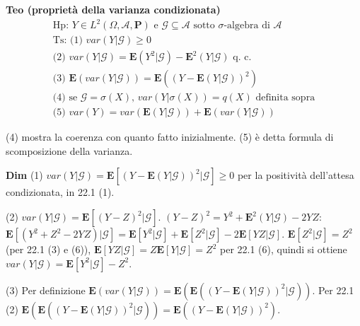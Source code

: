\documentclass{article}
\begin{document}
\textbf{Teo (propriet\`{a} della varianza condizionata)}%
\begin{gather*}
\text{Hp: }Y\in L^{2}\left( \Omega ,\mathcal{A},\mathbf{P}\right) \text{ e }%
\mathcal{G\subseteq A}\text{ sotto }\sigma \text{-algebra di }\mathcal{A} \\
\text{Ts: (1) }var\left( Y|\mathcal{G}\right) \geq 0 \\
\text{(2) }var\left( Y|\mathcal{G}\right) =\mathbf{E}\left( Y^{2}|\mathcal{G}%
\right) -\mathbf{E}^{2}\left( Y|\mathcal{G}\right) \text{ q. c.} \\
\text{(3) }\mathbf{E}\left( var\left( Y|\mathcal{G}\right) \right) =\mathbf{E%
}\left( \left( Y-\mathbf{E}\left( Y|\mathcal{G}\right) \right) ^{2}\right) \\
\text{(4) se }\mathcal{G}=\sigma \left( X\right) \text{, }var\left( Y|\sigma
\left( X\right) \right) =q\left( X\right) \text{ definita sopra} \\
\text{(5) }var\left( Y\right) =var\left( \mathbf{E}\left( Y|\mathcal{G}%
\right) \right) +\mathbf{E}\left( var\left( Y|\mathcal{G}\right) \right)
\end{gather*}

(4) mostra la coerenza con quanto fatto inizialmente. (5) \`{e} detta
formula di scomposizione della varianza.

\textbf{Dim} (1) $var\left( Y|\mathcal{G}\right) =\mathbf{E}\left[ \left( Y-%
\mathbf{E}\left( Y|\mathcal{G}\right) \right) ^{2}|\mathcal{G}\right] \geq 0$
per la positivit\`{a} dell'attesa condizionata, in 22.1 (1).

(2) $var\left( Y|\mathcal{G}\right) =\mathbf{E}\left[ \left( Y-Z\right) ^{2}|%
\mathcal{G}\right] $. $\left( Y-Z\right) ^{2}=Y^{2}+\mathbf{E}^{2}\left( Y|%
\mathcal{G}\right) -2YZ$: $\mathbf{E}\left[ \left( Y^{2}+Z^{2}-2YZ\right) |%
\mathcal{G}\right] =\mathbf{E}\left[ Y^{2}|\mathcal{G}\right] +\mathbf{E}%
\left[ Z^{2}|\mathcal{G}\right] -2\mathbf{E}\left[ YZ|\mathcal{G}\right] $. $%
\mathbf{E}\left[ Z^{2}|\mathcal{G}\right] =Z^{2}$ (per 22.1 (3) e (6)), $%
\mathbf{E}\left[ YZ|\mathcal{G}\right] =Z\mathbf{E}\left[ Y|\mathcal{G}%
\right] =Z^{2}$ per 22.1 (6), quindi si ottiene $var\left( Y|\mathcal{G}%
\right) =\mathbf{E}\left[ Y^{2}|\mathcal{G}\right] -Z^{2}$.

(3) Per definizione $\mathbf{E}\left( var\left( Y|\mathcal{G}\right) \right)
=\mathbf{E}\left( \mathbf{E}\left( \left( Y-\mathbf{E}\left( Y|\mathcal{G}%
\right) \right) ^{2}|\mathcal{G}\right) \right) $. Per 22.1 (2) $\mathbf{E}%
\left( \mathbf{E}\left( \left( Y-\mathbf{E}\left( Y|\mathcal{G}\right)
\right) ^{2}|\mathcal{G}\right) \right) =\mathbf{E}\left( \left( Y-\mathbf{E}%
\left( Y|\mathcal{G}\right) \right) ^{2}\right) $.
\end{document}
